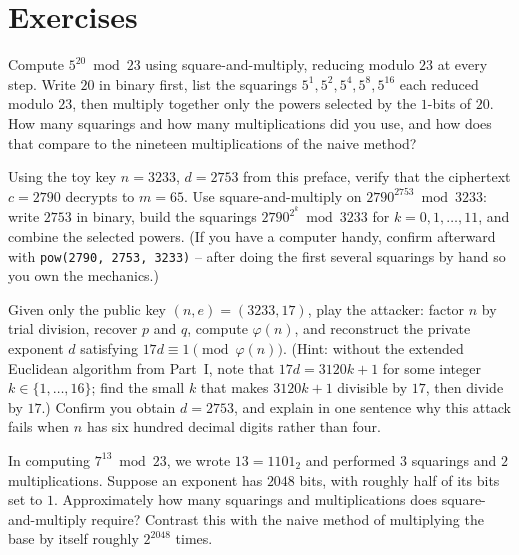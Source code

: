 \section*{Exercises}

\begin{exercise}
Compute $5^{20} \bmod 23$ using square-and-multiply, reducing modulo $23$ at every step. Write $20$ in binary first, list the squarings $5^{1}, 5^{2}, 5^{4}, 5^{8}, 5^{16}$ each reduced modulo $23$, then multiply together only the powers selected by the $1$-bits of $20$. How many squarings and how many multiplications did you use, and how does that compare to the nineteen multiplications of the naive method?
\end{exercise}

\begin{exercise}
Using the toy key $n = 3233$, $d = 2753$ from this preface, verify that the ciphertext $c = 2790$ decrypts to $m = 65$. Use square-and-multiply on $2790^{2753} \bmod 3233$: write $2753$ in binary, build the squarings $2790^{2^{k}} \bmod 3233$ for $k = 0, 1, \dots, 11$, and combine the selected powers. (If you have a computer handy, confirm afterward with \texttt{pow(2790, 2753, 3233)} -- after doing the first several squarings by hand so you own the mechanics.)
\end{exercise}

\begin{exercise}
Given only the public key $(n, e) = (3233, 17)$, play the attacker: factor $n$ by trial division, recover $p$ and $q$, compute $\varphi(n)$, and reconstruct the private exponent $d$ satisfying $17 d \equiv 1 \pmod{\varphi(n)}$. (Hint: without the extended Euclidean algorithm from Part~I, note that $17 d = 3120 k + 1$ for some integer $k \in \{1, \dots, 16\}$; find the small $k$ that makes $3120 k + 1$ divisible by $17$, then divide by $17$.) Confirm you obtain $d = 2753$, and explain in one sentence why this attack fails when $n$ has six hundred decimal digits rather than four.
\end{exercise}

\begin{exercise}
In computing $7^{13} \bmod 23$, we wrote $13 = 1101_2$ and performed $3$ squarings and $2$ multiplications. Suppose an exponent has $2048$ bits, with roughly half of its bits set to $1$. Approximately how many squarings and multiplications does square-and-multiply require? Contrast this with the naive method of multiplying the base by itself roughly $2^{2048}$ times.
\end{exercise}

